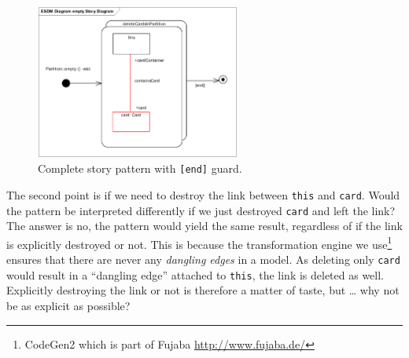 \begin{figure}[htp]
\begin{center}
  \includegraphics[width=0.6\textwidth]{pics/sdmBilder/empty/sdm47}
  \caption{Complete story pattern with \texttt{[end]} guard.}  
  \label{fig:sdm_end}
\end{center}
\end{figure}

The second point is if we need to destroy the link between \texttt{this} and
\texttt{card}.  Would the pattern be interpreted differently if we just
destroyed \texttt{card} and left the link?  The answer is no, the pattern would
yield the same result, regardless of if the link is explicitly destroyed or not.
This is because the transformation engine we use\footnote{CodeGen2 which is
part of Fujaba \url{http://www.fujaba.de/}} ensures that there are never any
\emph{dangling edges} in a model.  As deleting only \texttt{card} would result
in a ``dangling edge'' attached to \texttt{this}, the link is deleted as well.
Explicitly destroying the link or not is therefore a matter of taste, but \ldots
why not be as explicit as possible?
